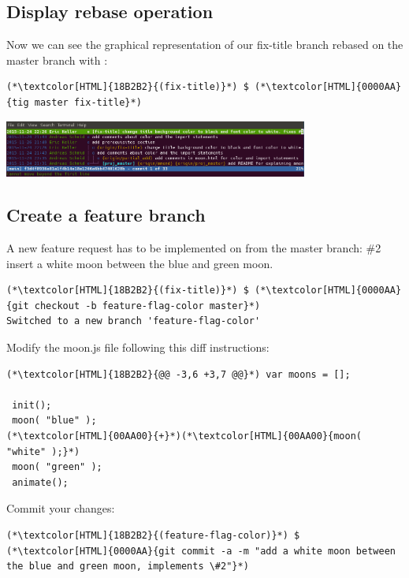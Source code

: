 \subsection{Display rebase operation}
\begin{frame}[fragile]
  \subslidetitle

  Now we can see the graphical representation of our fix-title branch rebased on the master branch with :
  \begin{lstlisting}
(*\textcolor[HTML]{18B2B2}{(fix-title)}*) $ (*\textcolor[HTML]{0000AA}{tig master fix-title}*)
\end{lstlisting}

  \vspace{1em}

  \centerline{\includegraphics[width=10cm]{../screen/tig-fix-title-rebase-master.png}}

\end{frame}

\subsection{Create a feature branch}
\begin{frame}[fragile]
  \subslidetitle

  A new feature request has to be implemented on from the master branch:
  \newline \vspace{1em}
  \#2 insert a white moon between the blue and green moon.
  \begin{lstlisting}
(*\textcolor[HTML]{18B2B2}{(fix-title)}*) $ (*\textcolor[HTML]{0000AA}{git checkout -b feature-flag-color master}*)
Switched to a new branch 'feature-flag-color'
\end{lstlisting}
  Modify the moon.js file following this diff instructions:
  \begin{lstlisting}
(*\textcolor[HTML]{18B2B2}{@@ -3,6 +3,7 @@}*) var moons = [];

 init();
 moon( "blue" );
(*\textcolor[HTML]{00AA00}{+}*)(*\textcolor[HTML]{00AA00}{moon( "white" );}*)
 moon( "green" );
 animate();
\end{lstlisting}
  Commit your changes:
  \begin{lstlisting}
(*\textcolor[HTML]{18B2B2}{(feature-flag-color)}*) $ (*\textcolor[HTML]{0000AA}{git commit -a -m "add a white moon between the blue and green moon, implements \#2"}*)
\end{lstlisting}

\end{frame}


